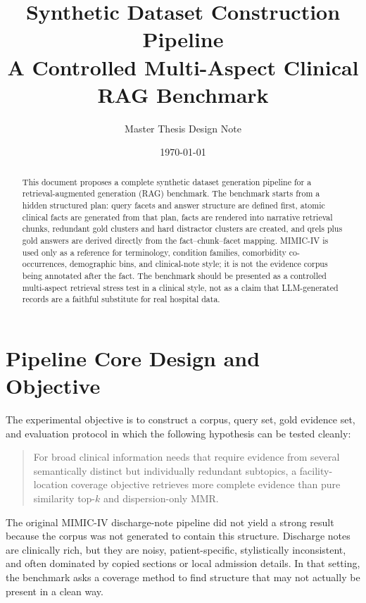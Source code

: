 \documentclass[11pt,a4paper]{article}
\title{\textbf{Synthetic Dataset Construction Pipeline}\\
\large A Controlled Multi-Aspect Clinical RAG Benchmark}
\author{Master Thesis Design Note}
\date{\today}
\begin{document}
\maketitle

\begin{abstract}
	This document proposes a complete synthetic dataset generation pipeline for a retrieval-augmented generation (RAG) benchmark. The benchmark starts from a hidden structured plan: query facets and answer structure are defined first, atomic clinical facts are generated from that plan, facts are rendered into narrative retrieval chunks, redundant gold clusters and hard distractor clusters are created, and qrels plus gold answers are derived directly from the fact--chunk--facet mapping. MIMIC-IV is used only as a reference for terminology, condition families, comorbidity co-occurrences, demographic bins, and clinical-note style; it is not the evidence corpus being annotated after the fact. The benchmark should be presented as a controlled multi-aspect retrieval stress test in a clinical style, not as a claim that LLM-generated records are a faithful substitute for real hospital data.
\end{abstract}

\tableofcontents
\newpage

\section{Pipeline Core Design and Objective}

The experimental objective is to construct a corpus, query set, gold evidence set, and evaluation protocol in which the following hypothesis can be tested cleanly:

\begin{quote}
	For broad clinical information needs that require evidence from several semantically distinct but individually redundant subtopics, a facility-location coverage objective retrieves more complete evidence than pure similarity top-$k$ and dispersion-only MMR.
\end{quote}

The original MIMIC-IV discharge-note pipeline did not yield a strong result because the corpus was not generated to contain this structure. Discharge notes are clinically rich, but they are noisy, patient-specific, stylistically inconsistent, and often dominated by copied sections or local admission details. In that setting, the benchmark asks a coverage method to find structure that may not actually be present in a clean way.
\end{document}
